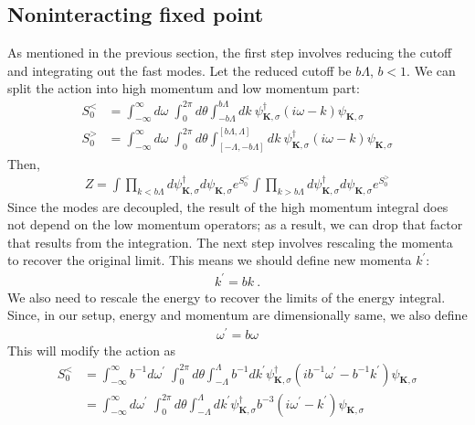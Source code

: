 \documentclass[14pt]{extarticle}
\begin{document}
\subsection*{Noninteracting fixed point}
As mentioned in the previous section, the first step involves reducing the cutoff and integrating out the fast modes. Let the reduced cutoff be \(b\Lambda\), \(b<1\). We can split the action into high momentum and low momentum part:
\begin{equation}\begin{aligned}
	S_0^< &= \int_{-\infty}^\infty d\omega\;\int_0^{2\pi} d\theta \int_{- b\Lambda}^{b\Lambda}dk~\psi_{\mathbf{K},\sigma}^\dagger \left(i\omega - k\right)\psi_{\mathbf{K},\sigma}\\
	S_0^> &= \int_{-\infty}^\infty d\omega\;\int_0^{2\pi} d\theta \int_{\left[-\Lambda,- b\Lambda\right]}^{\left[b\Lambda,\Lambda\right]}dk~\psi_{\mathbf{K},\sigma}^\dagger \left(i\omega - k\right)\psi_{\mathbf{K},\sigma}
\end{aligned}\end{equation}
Then,
\begin{equation}\begin{aligned}
	Z = \int \prod_{k<b\Lambda} d\psi^\dagger_{\mathbf{K},\sigma} d\psi_{\mathbf{K},\sigma} e^{S_0^<}\int \prod_{k>b\Lambda} d\psi^\dagger_{\mathbf{K},\sigma} d\psi_{\mathbf{K},\sigma} e^{S_0^>}
\end{aligned}\end{equation}
Since the modes are decoupled, the result of the high momentum integral does not depend on the low momentum operators; as a result, we can drop that factor that results from the integration. The next step involves rescaling the momenta to recover the original limit. This means we should define new momenta \(k^\prime\):
\begin{equation}\begin{aligned}
k^\prime = b k~.
\end{aligned}\end{equation}
We also need to rescale the energy to recover the limits of the energy integral. Since, in our setup, energy and momentum are dimensionally same, we also define 
\begin{equation}\begin{aligned}
\omega^\prime = b \omega
\end{aligned}\end{equation}
This will modify the action as
\begin{equation}\begin{aligned}
	S_0^< &= \int_{-\infty}^\infty b^{-1} d\omega^\prime\;\int_0^{2\pi} d\theta \int_{-\Lambda}^{\Lambda}b^{-1} dk^\prime\psi_{\mathbf{K},\sigma}^\dagger \left(ib^{-1}\omega^\prime - b^{-1}k^\prime\right)\psi_{\mathbf{K},\sigma}\\
	      &=\int_{-\infty}^\infty d\omega^\prime\;\int_0^{2\pi} d\theta \int_{-\Lambda}^{\Lambda}dk^\prime\psi_{\mathbf{K},\sigma}^\dagger b^{-3} \left(i\omega^\prime - k^\prime\right)\psi_{\mathbf{K},\sigma}
\end{aligned}\end{equation}
\end{document}
